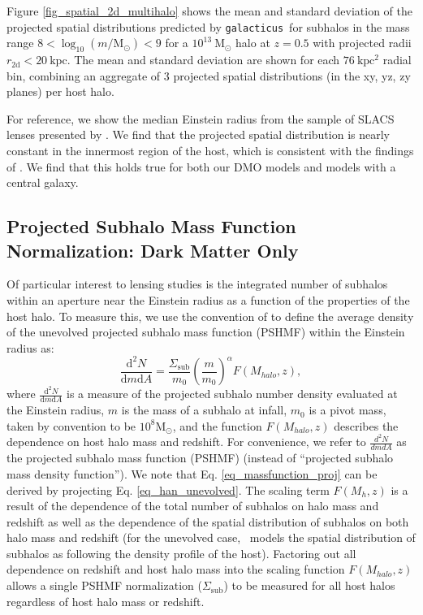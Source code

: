 \documentclass[%
 reprint,
 amsmath,
 amssymb,
 aps,
prd,
twocolumn,
superscriptaddress,
preprintnumbers,
floatfix,
nofootinbib
]{revtex4-2}
\def\gal{{\tt galacticus}~}
\def\hanetal{\citet{10.1093/mnras/stv2900}~}
\newcommand{\reffig}[1]{Figure \ref{#1}}
\newcommand{\refeq}[1]{Eq. \ref{#1}}
\begin{document}
\reffig{fig_spatial_2d_multihalo} shows the mean and standard deviation of the projected spatial distributions predicted by \gal for subhalos in the mass range $8 < \log_{10}\left( m / \mathrm{M}_\odot \right) < 9$ for a $10^{13} ~\mathrm{M}_\odot$ halo at $z=0.5$ with projected radii $r_{\mathrm{2d}} < 20 ~\text{kpc}$.
The mean and standard deviation are shown for each $76 \mathrm{~kpc^2}$ radial bin, combining an aggregate of 3 projected spatial distributions (in the xy, yz, zy planes) per host halo. 
 

For reference, we show the median Einstein radius from the sample of SLACS lenses presented by \citet{shu2017sloan}.
We find that the projected spatial distribution is nearly constant in the innermost region of the host, which is consistent with the findings of \citet{10.1093/mnras/stu2673}. 
We find that this holds true for both our DMO models and models with a central galaxy.

\subsection{Projected Subhalo Mass Function Normalization: Dark Matter Only}\label{sec_norm}

Of particular interest to lensing studies is the integrated number of subhalos within an aperture near the Einstein radius as a function of the properties of the host halo.
To measure this, we use the convention of \citet{10.1093/mnras/stz3480} to define the average density of the unevolved projected subhalo mass function (PSHMF) within the Einstein radius as:
\begin{equation}\label{eq_massfunction_proj}
    \frac{\mathrm{d}^2N}{\mathrm{d}m\mathrm{d}A} =  \frac{\Sigma_{\mathrm{sub}}}{m_0}\left (\frac{m}{m_0} \right)^{\alpha}F(M_{halo},z),
\end{equation}
where $\frac{\mathrm{d}^2N}{\mathrm{d}m\mathrm{d}A}$ is a measure of the projected subhalo number density evaluated at the Einstein radius, $m$ is the mass of a subhalo at infall, $m_{0}$ is a pivot mass, taken by convention to be $10^{8} \mathrm{M}_{\odot}$, and the function $F(M_{halo},z)$ describes the dependence on host halo mass and redshift.
For convenience, we refer to $\frac{d^2N}{dmdA}$ as the projected subhalo mass function (PSHMF) (instead of ``projected subhalo mass density function'').
We note that \refeq{eq_massfunction_proj} can be derived by projecting \refeq{eq_han_unevolved}. 
The scaling term $F(M_h, z)$ is a result of the dependence of the total number of subhalos on halo mass and redshift as well as the dependence of the spatial distribution of subhalos on both halo mass and redshift (for the unevolved case, \hanetal models the spatial distribution of subhalos as following the density profile of the host).
Factoring out all dependence on redshift and host halo mass into the scaling function $F(M_{halo},z)$ allows a single PSHMF normalization ($\Sigma_{\mathrm{sub}}$) to be measured for all host halos regardless of host halo mass or redshift.
\end{document}
